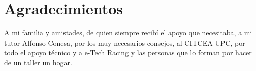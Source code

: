 \chapter*{Agradecimientos}

A mi familia y amistades, de quien siempre recibí el apoyo que necesitaba, a mi tutor Alfonso Conesa, por los muy necesarios consejos, al CITCEA-UPC, por todo el apoyo técnico y a e-Tech Racing y las personas que lo forman por hacer de un taller un hogar.